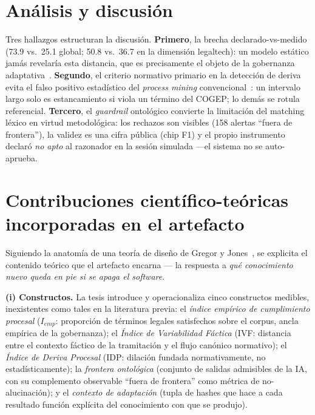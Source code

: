 \documentclass[a4paper,openany,12pt]{book}
\begin{document}
\section{Análisis y discusión}
Tres hallazgos estructuran la discusión. \textbf{Primero}, la brecha declarado-vs-medido (73.9 vs.\ 25.1 global; 50.8 vs.\ 36.7 en la dimensión legaltech): un modelo estático jamás revelaría esta distancia, que es precisamente el objeto de la gobernanza adaptativa~\cite{janssen2016}. \textbf{Segundo}, el criterio normativo primario en la detección de deriva evita el falso positivo estadístico del \textit{process mining} convencional~\cite{bose2014}: un intervalo largo solo es estancamiento si viola un término del COGEP; lo demás se rotula referencial. \textbf{Tercero}, el \textit{guardrail} ontológico convierte la limitación del matching léxico en virtud metodológica: los rechazos son visibles (158 alertas ``fuera de frontera''), la validez es una cifra pública (chip F1) y el propio instrumento declaró \textit{no apto} al razonador en la sesión simulada ---el sistema no se auto-aprueba.

\section{Contribuciones científico-teóricas incorporadas en el artefacto}
Siguiendo la anatomía de una teoría de diseño de Gregor y Jones~\cite{gregor2007}, se explicita el contenido teórico que el artefacto encarna --- la respuesta a \emph{qué conocimiento nuevo queda en pie si se apaga el software}.

\textbf{(i) Constructos.} La tesis introduce y operacionaliza cinco constructos medibles, inexistentes como tales en la literatura previa: el \emph{índice empírico de cumplimiento procesal} ($I_{emp}$: proporción de términos legales satisfechos sobre el corpus, ancla empírica de la gobernanza); el \emph{Índice de Variabilidad Fáctica} (IVF: distancia entre el contexto fáctico de la tramitación y el flujo canónico normativo); el \emph{Índice de Deriva Procesal} (IDP: dilación fundada normativamente, no estadísticamente); la \emph{frontera ontológica} (conjunto de salidas admisibles de la IA, con su complemento observable ``fuera de frontera'' como métrica de no-alucinación); y el \emph{contexto de adaptación} (tupla de hashes que hace a cada resultado función explícita del conocimiento con que se produjo).
\end{document}
